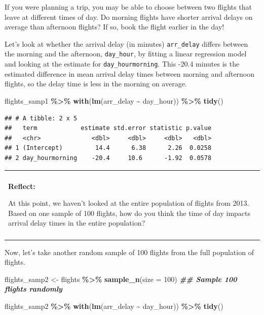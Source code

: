 \documentclass[
]{book}
\newenvironment{Shaded}{\begin{snugshade}}{\end{snugshade}}
\newcommand{\AttributeTok}[1]{\textcolor[rgb]{0.13,0.29,0.53}{#1}}
\newcommand{\DecValTok}[1]{\textcolor[rgb]{0.00,0.00,0.81}{#1}}
\newcommand{\DocumentationTok}[1]{\textcolor[rgb]{0.56,0.35,0.01}{\textbf{\textit{#1}}}}
\newcommand{\FunctionTok}[1]{\textcolor[rgb]{0.13,0.29,0.53}{\textbf{#1}}}
\newcommand{\NormalTok}[1]{#1}
\newcommand{\OtherTok}[1]{\textcolor[rgb]{0.56,0.35,0.01}{#1}}
\newcommand{\SpecialCharTok}[1]{\textcolor[rgb]{0.81,0.36,0.00}{\textbf{#1}}}
\newenvironment{reflect}
{
    \begin{center}
    
    \begin{tabular}{|p{0.8\textwidth}|}
    \rowcolor{LightBlue}
    \hline\\
    \rowcolor{LightBlue}
    \textbf{Reflect:}
}
{
    \\\rowcolor{LightBlue}
    \\\hline
    \end{tabular} 
    \end{center}
}
\begin{document}
If you were planning a trip, you may be able to choose between two flights that leave at different times of day. Do morning flights have shorter arrival delays on average than afternoon flights? If so, book the flight earlier in the day!

Let's look at whether the arrival delay (in minutes) \texttt{arr\_delay} differs between the morning and the afternoon, \texttt{day\_hour}, by fitting a linear regression model and looking at the estimate for \texttt{day\_hourmorning}. This -20.4 minutes is the estimated difference in mean arrival delay times between morning and afternoon flights, so the delay time is less in the morning on average.

\begin{Shaded}
\begin{Highlighting}[]
\NormalTok{flights\_samp1 }\SpecialCharTok{\%\textgreater{}\%}
    \FunctionTok{with}\NormalTok{(}\FunctionTok{lm}\NormalTok{(arr\_delay }\SpecialCharTok{\textasciitilde{}}\NormalTok{ day\_hour)) }\SpecialCharTok{\%\textgreater{}\%}
    \FunctionTok{tidy}\NormalTok{()}
\end{Highlighting}
\end{Shaded}

\begin{verbatim}
## # A tibble: 2 x 5
##   term            estimate std.error statistic p.value
##   <chr>              <dbl>     <dbl>     <dbl>   <dbl>
## 1 (Intercept)         14.4      6.38      2.26  0.0258
## 2 day_hourmorning    -20.4     10.6      -1.92  0.0578
\end{verbatim}

\begin{reflect}
At this point, we haven't looked at the entire population of flights
from 2013. Based on one sample of 100 flights, how do you think the time
of day impacts arrival delay times in the entire population?
\end{reflect}

Now, let's take another random sample of 100 flights from the full population of flights.

\begin{Shaded}
\begin{Highlighting}[]
\NormalTok{flights\_samp2 }\OtherTok{\textless{}{-}}\NormalTok{ flights }\SpecialCharTok{\%\textgreater{}\%}
    \FunctionTok{sample\_n}\NormalTok{(}\AttributeTok{size =} \DecValTok{100}\NormalTok{) }\DocumentationTok{\#\# Sample 100 flights randomly}

\NormalTok{flights\_samp2 }\SpecialCharTok{\%\textgreater{}\%}
    \FunctionTok{with}\NormalTok{(}\FunctionTok{lm}\NormalTok{(arr\_delay }\SpecialCharTok{\textasciitilde{}}\NormalTok{ day\_hour)) }\SpecialCharTok{\%\textgreater{}\%}
    \FunctionTok{tidy}\NormalTok{()}
\end{Highlighting}
\end{Shaded}
\end{document}

